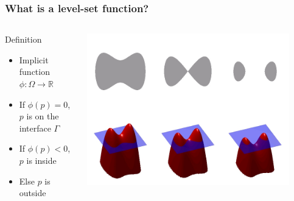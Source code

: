 \begin{frame}
\frametitle{What is a level-set function?}

\begin{columns}
\begin{block}{Definition}
\begin{itemize}
\item Implicit function $\phi : \Omega \rightarrow \mathbb{R}$
\item If $\phi(p) = 0$, $p$ is on the interface $\Gamma$
\item If $\phi(p) < 0$, $p$ is inside
\item Else $p$ is outside
\end{itemize}
\end{block}
\begin{center}
 \includegraphics[width=0.9\textwidth]{../Art/Level_set_method.jpg}
\end{center}

\end{columns}

\end{frame}


